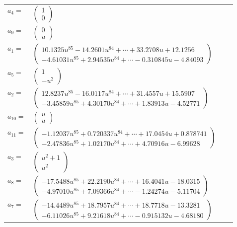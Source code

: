 \documentclass[1p]{elsarticle_modified}
\theoremstyle{definition}
\begin{document}
\begin{tabular}{m{7pt} m{180pt} m{7pt} m{180pt} }
\flushright $a_{4}=$&$\begin{pmatrix}1\\0\end{pmatrix}$ \\
\flushright $a_{9}=$&$\begin{pmatrix}0\\u\end{pmatrix}$ \\
\flushright $a_{1}=$&$\begin{pmatrix}10.1325 u^{85}-14.2601 u^{84}+\cdots+33.2708 u+12.1256\\-4.61031 u^{85}+2.94535 u^{84}+\cdots-0.310845 u-4.84093\end{pmatrix}$ \\
\flushright $a_{5}=$&$\begin{pmatrix}1\\- u^2\end{pmatrix}$ \\
\flushright $a_{2}=$&$\begin{pmatrix}12.8237 u^{85}-16.0117 u^{84}+\cdots+31.4557 u+15.5907\\-3.45859 u^{85}+4.30170 u^{84}+\cdots+1.83913 u-4.52771\end{pmatrix}$ \\
\flushright $a_{10}=$&$\begin{pmatrix}u\\u\end{pmatrix}$ \\
\flushright $a_{11}=$&$\begin{pmatrix}-1.12037 u^{85}+0.720337 u^{84}+\cdots+17.0454 u+0.878741\\-2.47836 u^{85}+1.02170 u^{84}+\cdots+4.70916 u-6.99628\end{pmatrix}$ \\
\flushright $a_{3}=$&$\begin{pmatrix}u^2+1\\u^2\end{pmatrix}$ \\
\flushright $a_{8}=$&$\begin{pmatrix}-17.5488 u^{85}+22.2190 u^{84}+\cdots+16.4041 u-18.0315\\-4.97010 u^{85}+7.09366 u^{84}+\cdots-1.24274 u-5.11704\end{pmatrix}$ \\
\flushright $a_{7}=$&$\begin{pmatrix}-14.4489 u^{85}+18.7957 u^{84}+\cdots+18.7718 u-13.3281\\-6.11026 u^{85}+9.21618 u^{84}+\cdots-0.915132 u-4.68180\end{pmatrix}$ \\

\end{tabular}
\end{document}
